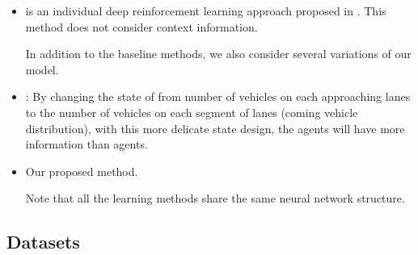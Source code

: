 \begin{itemize}[wide,noitemsep,topsep=0pt]

\item \textbf{\Deeplight} is an individual deep reinforcement learning approach proposed in \cite{wei2018intellilight}. This method does not consider context information.

In addition to the baseline methods, we also consider several variations of our model.

\item \textbf{\SDeeplight}: By changing the state of \Deeplight from number of vehicles on each approaching lanes to the number of vehicles on each segment of lanes (coming vehicle distribution), with this more delicate state design, the agents will have more information than \Deeplight agents.


\item \textbf{\SNDeeplight} Our proposed method. 

Note that all the learning methods share the same neural network structure.



\end{itemize}


\subsection{Datasets}

